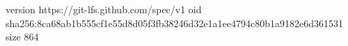 version https://git-lfs.github.com/spec/v1
oid sha256:8ca68ab1b555cf1e55d8d05f3fb38246d32e1a1ee4794c80b1a9182e6d361531
size 864
